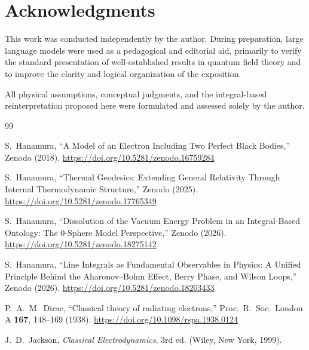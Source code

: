 \documentclass[12pt,a4paper]{article}
\begin{document}
\section*{Acknowledgments}

This work was conducted independently by the author. During preparation, large language models were used as a pedagogical and editorial aid, primarily to verify the standard presentation of well-established results in quantum field theory and to improve the clarity and logical organization of the exposition.

All physical assumptions, conceptual judgments, and the integral-based reinterpretation proposed here were formulated and assessed solely by the author.

\clearpage

\begin{thebibliography}{99}


S.~Hanamura,
``A Model of an Electron Including Two Perfect Black Bodies,''
Zenodo (2018).
\href{https://doi.org/10.5281/zenodo.16759284}{https://doi.org/10.5281/zenodo.16759284}

S.~Hanamura,
``Thermal Geodesics: Extending General Relativity Through Internal Thermodynamic Structure,''
Zenodo (2025).
\href{https://doi.org/10.5281/zenodo.17765349}{https://doi.org/10.5281/zenodo.17765349}

S.~Hanamura,
``Dissolution of the Vacuum Energy Problem in an Integral-Based Ontology: The 0-Sphere Model Perspective,''
Zenodo (2026).
\href{https://doi.org/10.5281/zenodo.18275142}{https://doi.org/10.5281/zenodo.18275142}

S.~Hanamura,
``Line Integrals as Fundamental Observables in Physics: A Unified Principle Behind the Aharonov--Bohm Effect, Berry Phase, and Wilson Loops,''
Zenodo (2026).
\href{https://doi.org/10.5281/zenodo.18203433}{https://doi.org/10.5281/zenodo.18203433}

P.~A.~M.~Dirac,
``Classical theory of radiating electrons,''
Proc.\ R.\ Soc.\ London A \textbf{167}, 148--169 (1938).
\href{https://doi.org/10.1098/rspa.1938.0124}{https://doi.org/10.1098/rspa.1938.0124}

J.~D.~Jackson,
\textit{Classical Electrodynamics}, 3rd ed.
(Wiley, New York, 1999).


\end{thebibliography}
\end{document}
